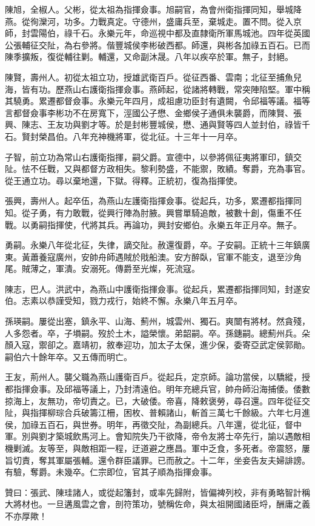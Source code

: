 \begin{pinyinscope}
陳旭，全椒人。父彬，從太祖為指揮僉事。旭嗣官，為會州衛指揮同知，舉城降燕。從徇灤河，功多。力戰真定。守德州，盛庸兵至，棄城走。置不問。從入京師，封雲陽伯，祿千石。永樂元年，命巡視中都及直隸衛所軍馬城池。四年從英國公張輔征交阯，為右參將。偕豐城侯李彬破西都。師還，與彬各加祿五百石。已而陳季擴叛，復從輔往剿。輔還，又命副沐晟。八年以疾卒於軍。無子，封絕。

陳賢，壽州人。初從太祖立功，授雄武衛百戶。從征西番、雲南；北征至捕魚兒海，皆有功。歷燕山右護衛指揮僉事。燕師起，從諸將轉戰，常突陣陷堅。軍中稱其驍勇。累遷都督僉事。永樂元年四月，成祖慮功臣封有遺闕，令邱福等議。福等言都督僉事李彬功不在房寬下，涇國公子懋、金鄉侯子通俱未襲爵，而陳賢、張興、陳志、王友功與劉才等。於是封彬豐城侯，懋、通與賢等四人並封伯，祿皆千石。賢封榮昌伯。八年充神機將軍，從北征。十三年十一月卒。

子智，前立功為常山右護衛指揮，嗣父爵。宣德中，以參將佩征夷將軍印，鎮交阯。怯不任戰，又與都督方政相失。黎利勢盛，不能禦，敗績。奪爵，充為事官。從王通立功。尋以棄地還，下獄。得釋。正統初，復為指揮使。

張興，壽州人。起卒伍，為燕山左護衛指揮僉事。從起兵，功多，累遷都指揮同知。從子勇，有力敢戰，從興行陣為肘腋。興嘗單騎追敵，被數十創，傷重不任戰。以勇嗣指揮使，代將其兵。再論功，興封安鄉伯。永樂五年正月卒。無子。

勇嗣。永樂八年從北征，失律，謫交阯。赦還復爵，卒。子安嗣。正統十三年鎮廣東。黃蕭養寇廣州，安帥舟師遇賊於戙船澳。安方醉臥，官軍不能支，退至沙角尾。賊薄之，軍潰。安溺死。傳爵至光燦，死流寇。

陳志，巴人。洪武中，為燕山中護衛指揮僉事。從起兵，累遷都指揮同知，封遂安伯。志素以恭謹受知，戮力戎行，始終不懈。永樂八年五月卒。

孫瑛嗣。屢從出塞，鎮永平、山海、薊州，城雲州、獨石。爽闓有將材。然貪殘，人多怨者。卒，子塤嗣。歿於土木，謚榮懷。弟韶嗣。卒。孫鏸嗣。總薊州兵。朵顏入寇，禦卻之。嘉靖初，敘奉迎功，加太子太保，進少保，委寄亞武定侯郭勛。嗣伯六十餘年卒。又五傳而明亡。

王友，荊州人。襲父職為燕山護衛百戶。從起兵，定京師。論功當侯，以驕縱，授都指揮僉事。及邱福等議上，乃封清遠伯。明年充總兵官，帥舟師沿海捕倭。倭數掠海上，友無功，帝切責之。已，大破倭。帝喜，降敕褒勞，尋召還。四年從征交阯，與指揮柳琮合兵破籌江柵，困枚、普賴諸山，斬首三萬七千餘級。六年七月進侯，加祿五百石，與世券。明年，再徵交阯，為副總兵。八年還，從北征，督中軍。別與劉才築城飲馬河上。會知院失乃干欲降，帝令友將士卒先行，諭以遇敵相機剿滅。友等至，與敵相距一程，迂道避之應昌。軍中乏食，多死者。帝震怒，屢旨切責，奪其軍屬張輔。還令群臣議罪。已而赦之。十二年，坐妾告友夫婦誹謗。有驗，奪爵。未幾卒。仁宗即位，官其子順為指揮僉事。

贊曰：張武、陳珪諸人，或從起籓封，或率先歸附，皆偏裨列校，非有勇略智計稱大將材也。一旦遘風雲之會，剖符策功，號稱佐命，與太祖開國諸臣埒，酬庸之義不亦厚歟！


\end{pinyinscope}